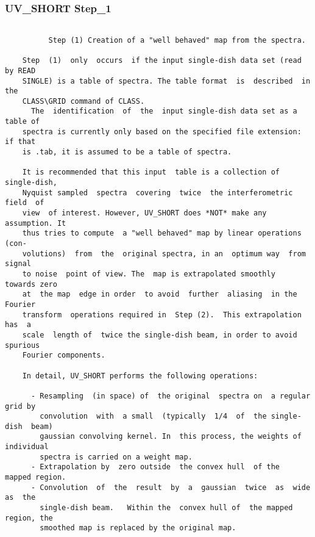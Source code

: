 \subsubsection{UV\_SHORT Step\_1}
\begin{verbatim}

          Step (1) Creation of a "well behaved" map from the spectra.

    Step  (1)  only  occurs  if the input single-dish data set (read by READ
    SINGLE) is a table of spectra. The table format  is  described  in   the
    CLASS\GRID command of CLASS.
      The  identification  of  the  input single-dish data set as a table of
    spectra is currently only based on the specified file extension: if that
    is .tab, it is assumed to be a table of spectra.

    It is recommended that this input  table is a collection of single-dish,
    Nyquist sampled  spectra  covering  twice  the interferometric field  of
    view  of interest. However, UV_SHORT does *NOT* make any  assumption. It
    thus tries to compute  a "well behaved" map by linear operations   (con-
    volutions)  from  the  original spectra, in an  optimum way  from signal
    to noise  point of view. The  map is extrapolated smoothly  towards zero
    at  the map  edge in order  to avoid  further  aliasing  in the  Fourier
    transform  operations required in  Step (2).  This extrapolation  has  a
    scale  length of  twice the single-dish beam, in order to avoid spurious
    Fourier components.

    In detail, UV_SHORT performs the following operations:

      - Resampling  (in space) of  the original  spectra on  a regular  grid by
        convolution  with  a small  (typically  1/4  of  the single-dish  beam)
        gaussian convolving kernel. In  this process, the weights of individual
        spectra is carried on a weight map.
      - Extrapolation by  zero outside  the convex hull  of the  mapped region.
      - Convolution  of  the  result  by  a  gaussian  twice  as  wide  as  the
        single-dish beam.   Within the  convex hull of  the mapped  region, the
        smoothed map is replaced by the original map.

\end{verbatim}
